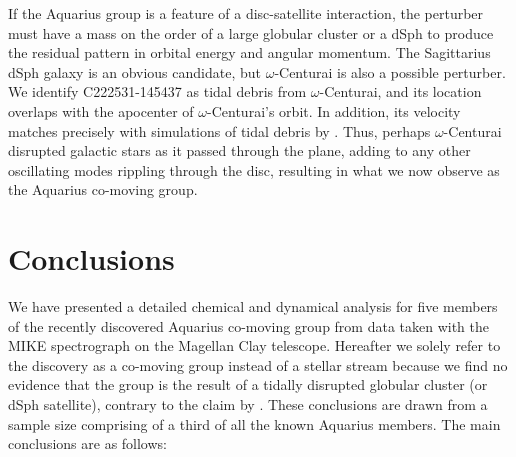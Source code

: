 \documentclass{emulateapj}
\begin{document}
If the Aquarius group is a feature of a disc-satellite interaction, the perturber must have a mass on the order of a large globular cluster or a dSph to produce the residual pattern in orbital energy and angular momentum. The Sagittarius dSph galaxy is an obvious candidate, but $\omega$-Centurai is also a possible perturber. We identify {C222531-145437} as tidal debris from $\omega$-Centurai, and its location overlaps with the apocenter of $\omega$-Centurai's orbit. In addition, its velocity matches precisely with simulations of tidal debris by \citet{majewski;et-al_2012}. Thus, perhaps $\omega$-Centurai disrupted galactic stars as it passed through the plane, adding to any other oscillating modes rippling through the disc, resulting in what we now observe as the Aquarius co-moving group.

\section{Conclusions}
\label{sec:conclusions}
We have presented a detailed chemical and dynamical analysis for five members of the recently discovered Aquarius co-moving group from data taken with the MIKE spectrograph on the Magellan Clay telescope. Hereafter we solely refer to the discovery as a co-moving group instead of a stellar stream because we find no evidence that the group is the result of a tidally disrupted globular cluster (or dSph satellite), contrary to the claim by \citet{wylie-de-boer;et-al_2012}. These conclusions are drawn from a sample size comprising of a third of all the known Aquarius members. The main conclusions are as follows:
\end{document}
